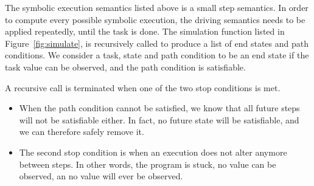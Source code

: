 The symbolic execution semantics listed above is a small step semantics.
In order to compute every possible symbolic execution, the driving semantics needs to be applied repeatedly, until the task is done.
The simulation function listed in Figure~\ref{fig:simulate}, is recursively called to produce a list of end states and path conditions.
We consider a task, state and path condition to be an end state if the task value can be observed, and the path condition is satisfiable.

A recursive call is terminated when one of the two stop conditions is met.

\begin{itemize}
  \item When the path condition cannot be satisfied, we know that all future steps will not be satisfiable either.
  In fact, no future state will be satisfiable, and we can therefore safely remove it.
  \item The second stop condition is when an execution does not alter anymore between steps.
  In other words, the program is stuck, no value can be observed, an no value will ever be observed.
\end{itemize}
\\

